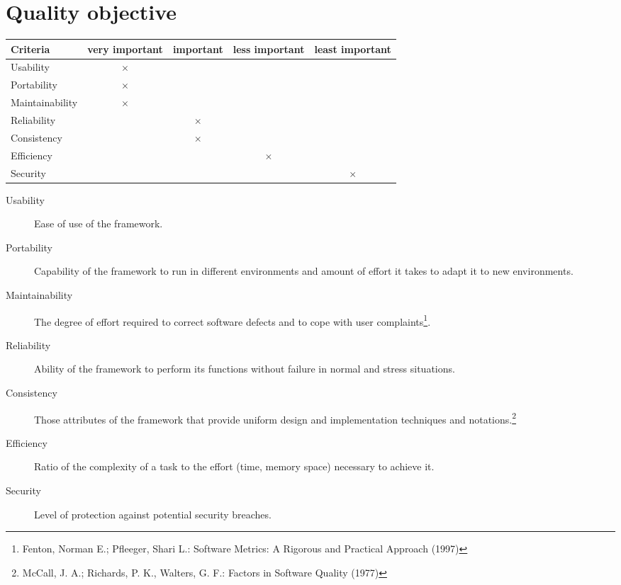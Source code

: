 \section{Quality objective}

\begin{tabular}{lcccc}
\hline
\textbf{Criteria} & \textbf{very important} & \textbf{important} & \textbf{less important} & \textbf{least important} \\
\hline
Usability & $\times$ & & & \\
Portability & $\times$ & & & \\
Maintainability & $\times$ & & & \\
Reliability & & $\times$ & & \\
Consistency & & $\times$ & & \\
Efficiency & & & $\times$ & \\
Security & & & & $\times$ \\
\hline

\end{tabular}


\begin{description}
	\item[Usability] Ease of use of the framework.
	\item[Portability] Capability of the framework to run in different environments and amount of effort it takes to adapt it to new environments.
	\item[Maintainability] The degree of effort required to correct software defects and to cope with user complaints\footnote{Fenton, Norman E.; Pfleeger, Shari L.: Software Metrics: A Rigorous and Practical Approach (1997)}.
	\item[Reliability] Ability of the framework to perform its functions without failure in normal and stress situations.
	\item[Consistency] Those attributes of the framework that provide uniform design and implementation techniques and notations.\footnote{McCall, J. A.; Richards, P. K., Walters, G. F.: Factors in Software Quality (1977)}
	\item[Efficiency] Ratio of the complexity of a task to the effort (time, memory space) necessary to achieve it.
	\item[Security] Level of protection against potential security breaches.
	
\end{description}